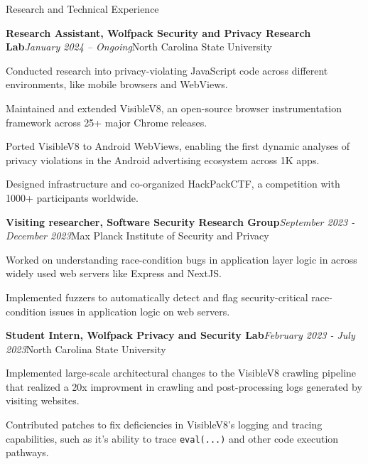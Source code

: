 \documentclass{resume} %
\begin{document}
\begin{rSection}{Research and Technical Experience}
\begin{rSubsection}{\bf Research Assistant, Wolfpack Security and Privacy Research Lab}{\em January 2024 -- Ongoing}{North Carolina State University}{}
\item Conducted research into privacy-violating JavaScript code across different environments, like mobile browsers and WebViews.
\item Maintained and extended VisibleV8, an open-source browser instrumentation framework across 25+ major Chrome releases.
\item Ported VisibleV8 to Android WebViews, enabling the first dynamic analyses of privacy violations in the Android advertising ecosystem across 1K apps.
\item Designed infrastructure and co-organized HackPackCTF, a competition with 1000+ participants worldwide.
\end{rSubsection}
\begin{rSubsection}{\bf Visiting researcher, Software Security Research Group}{\em September 2023 - December 2023}{Max Planck Institute of Security and Privacy}{}
\item Worked on understanding race-condition bugs in application layer logic in across widely used web servers like Express and NextJS.
\item Implemented fuzzers to automatically detect and flag security-critical race-condition issues in application logic on web servers.
\end{rSubsection}
\begin{rSubsection}{\bf Student Intern, Wolfpack Privacy and Security Lab}{\em February 2023 - July 2023}{North Carolina State University}{}
\item Implemented large-scale architectural changes to the VisibleV8 crawling pipeline that realized a 20x improvment in crawling and post-processing logs generated by visiting websites.
\item Contributed patches to fix deficiencies in VisibleV8's logging and tracing capabilities, such as it's ability to trace \texttt{eval(...)} and other code execution pathways.

\end{rSubsection}
\end{rSection}
\end{document}
